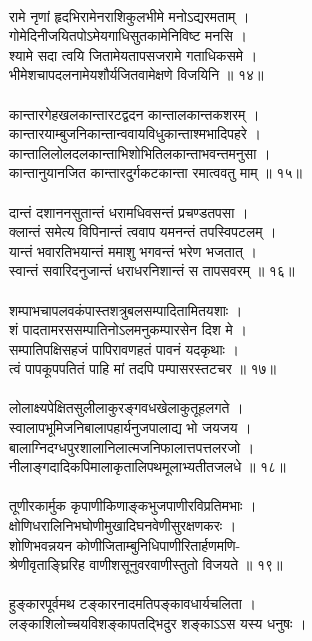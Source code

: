 \\
रामे नृणां हृदभिरामेनराशिकुलभीमे मनोऽद्यरमताम्  ।\\
गोमेदिनीजयितपोऽमेयगाधिसुतकामेनिविष्ट मनसि  ।\\
श्यामे सदा त्वयि जितामेयतापसजरामे गताधिकसमे  ।\\
भीमेशचापदलनामेयशौर्यजितवामेक्षणे विजयिनि  ॥ १४॥\\
\\
कान्तारगेहखलकान्तारटद्वदन कान्तालकान्तकशरम्  ।\\
कान्तारयाम्बुजनिकान्तान्ववायविधुकान्ताश्मभादिपहरे  ।\\
कान्तालिलोलदलकान्ताभिशोभितिलकान्ताभवन्तमनुसा  ।\\
कान्तानुयानजित  कान्तारदुर्गकटकान्ता रमात्ववतु माम्  ॥ १५॥\\
\\
दान्तं दशाननसुतान्तं धरामधिवसन्तं प्रचण्डतपसा  ।\\
क्लान्तं समेत्य विपिनान्तं त्ववाप यमनन्तं तपस्विपटलम्   ।\\
यान्तं भवारतिभयान्तं ममाशु भगवन्तं भरेण भजतात्  ।\\
स्वान्तं सवारिदनुजान्तं धराधरनिशान्तं स तापसवरम्  ॥ १६॥\\
\\
शम्पाभचापलवकंपास्तशत्रुबलसम्पादितामितयशाः  ।\\
शं पादतामरससम्पातिनोऽलमनुकम्पारसेन दिश मे  ।\\
सम्पातिपक्षिसहजं पापिरावणहतं पावनं यदकृथाः  ।\\
त्वं पापकूपपतितं पाहि मां तदपि पम्पासरस्तटचर  ॥ १७॥\\
\\
लोलाक्ष्यपेक्षितसुलीलाकुरङ्गवधखेलाकुतूहलगते  ।\\
स्वालापभूमिजनिबालापहार्यनुजपालाद्य भो जयजय  ।\\
बालाग्निदग्धपुरशालानिलात्मजनिफालात्तपत्तलरजो  ।\\
नीलाङ्गदादिकपिमालाकृतालिपथमूलाभ्यतीतजलधे  ॥ १८॥\\
\\
तूणीरकार्मुक कृपाणीकिणाङ्कभुजपाणीरविप्रतिमभाः  ।\\
क्षोणिधरालिनिभघोणीमुखादिघनवेणीसुरक्षणकरः  ।\\
शोणिभवन्नयन कोणीजिताम्बुनिधिपाणीरितार्हणमणि-\\
श्रेणीवृताङ्घ्रिरिह वाणीशसूनुवरवाणीस्तुतो विजयते  ॥ १९॥\\
\\
हुङ्कारपूर्वमथ टङ्कारनादमतिपङ्कावधार्यचलिता  ।\\
लङ्काशिलोच्चयविशङ्कापतद्भिदुर शङ्काऽऽस यस्य धनुषः  ।\\
